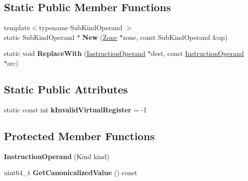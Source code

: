 \subsection*{Static Public Member Functions}
\begin{DoxyCompactItemize}
\item 
{\footnotesize template$<$typename Sub\+Kind\+Operand $>$ }\\static Sub\+Kind\+Operand $\ast$ {\bfseries New} (\hyperlink{classv8_1_1internal_1_1_zone}{Zone} $\ast$zone, const Sub\+Kind\+Operand \&op)\hypertarget{classv8_1_1internal_1_1compiler_1_1_instruction_operand_aae307b8218d280dd4346cb64791064f6}{}\label{classv8_1_1internal_1_1compiler_1_1_instruction_operand_aae307b8218d280dd4346cb64791064f6}

\item 
static void {\bfseries Replace\+With} (\hyperlink{classv8_1_1internal_1_1compiler_1_1_instruction_operand}{Instruction\+Operand} $\ast$dest, const \hyperlink{classv8_1_1internal_1_1compiler_1_1_instruction_operand}{Instruction\+Operand} $\ast$src)\hypertarget{classv8_1_1internal_1_1compiler_1_1_instruction_operand_a15887ba6659295069e44ae205b48a982}{}\label{classv8_1_1internal_1_1compiler_1_1_instruction_operand_a15887ba6659295069e44ae205b48a982}

\end{DoxyCompactItemize}
\subsection*{Static Public Attributes}
\begin{DoxyCompactItemize}
\item 
static const int {\bfseries k\+Invalid\+Virtual\+Register} = -\/1\hypertarget{classv8_1_1internal_1_1compiler_1_1_instruction_operand_acbe2539e980eb4f4522519b5e01c7fda}{}\label{classv8_1_1internal_1_1compiler_1_1_instruction_operand_acbe2539e980eb4f4522519b5e01c7fda}

\end{DoxyCompactItemize}
\subsection*{Protected Member Functions}
\begin{DoxyCompactItemize}
\item 
{\bfseries Instruction\+Operand} (Kind kind)\hypertarget{classv8_1_1internal_1_1compiler_1_1_instruction_operand_a1af29902564946c9def77d52efc0b28f}{}\label{classv8_1_1internal_1_1compiler_1_1_instruction_operand_a1af29902564946c9def77d52efc0b28f}

\item 
uint64\+\_\+t {\bfseries Get\+Canonicalized\+Value} () const \hypertarget{classv8_1_1internal_1_1compiler_1_1_instruction_operand_a81655217f8f05bdcf2155077d33274a8}{}\label{classv8_1_1internal_1_1compiler_1_1_instruction_operand_a81655217f8f05bdcf2155077d33274a8}

\end{DoxyCompactItemize}
